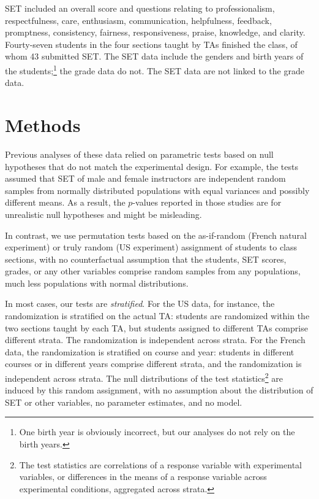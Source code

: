 \documentclass[12pt]{article}
\begin{document}
SET included an overall score and questions relating to
professionalism, respectfulness, care, enthusiasm, communication, helpfulness,
feedback, promptness, consistency, fairness, responsiveness, praise, knowledge, 
and clarity.
Fourty-seven students in the four sections taught by TAs finished the class,
of whom 43 submitted SET.
The SET data include the genders and birth years of the students;\footnote{%
One birth year is obviously incorrect, but our analyses do not rely on the birth years.
}%
the grade data do not.
The SET data are not linked to the grade data.

\section{Methods} \label{sec:methods}
Previous analyses of these data relied on parametric tests based on null
hypotheses that do not match the experimental design.
For example, the tests assumed that SET of male and female instructors
are independent random samples from normally distributed populations with 
equal variances and possibly different means.
As a result, the $p$-values reported in those studies are for unrealistic
null hypotheses and might be misleading.

In contrast, we use permutation tests based on the as-if-random (French natural experiment)
or truly random (US experiment) assignment of students
to class sections, with no counterfactual assumption that the students, SET scores,
grades, or any other variables comprise random samples from any populations, much
less populations with normal distributions.

In most cases, our tests are \emph{stratified}.
For the US data, for instance, the randomization is stratified on the actual TA:
students are randomized within the two sections taught by each TA,
but students assigned to different TAs comprise different strata.
The randomization is independent across strata.
For the French data, the randomization is stratified on course and year:
students in different courses or in different years comprise different strata,
and the randomization is independent across strata.
The null distributions of the test statistics\footnote{%
 The test statistics are correlations of a response variable with experimental variables,
 or differences in the means of a response variable across experimental
 conditions, aggregated across strata.
}
are induced by this random
assignment, with no assumption about the distribution of SET or other variables, 
no parameter estimates, and no model.
\end{document}
